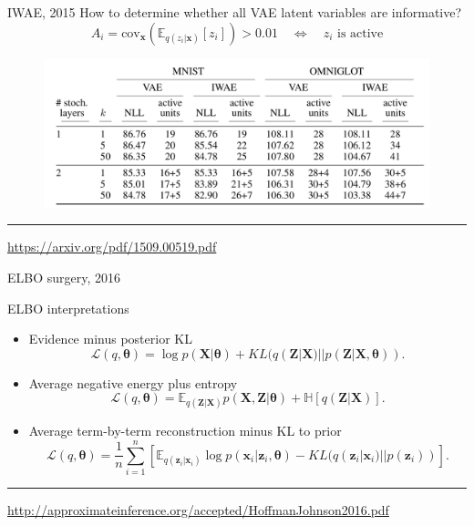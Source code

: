 \documentclass{beamer}
\newcommand{\bx}{\mathbf{x}}
\newcommand{\bz}{\mathbf{z}}
\newcommand{\bX}{\mathbf{X}}
\newcommand{\bZ}{\mathbf{Z}}
\newcommand{\btheta}{\boldsymbol{\theta}}
\begin{document}
\begin{frame}{IWAE, 2015}
How to determine whether all VAE latent variables are informative?
\[
    A_{i} = \text{cov}_\bx \left( \mathbb{E}_{q(z_i | \bx)} [z_i] \right) > 0.01 \quad \Leftrightarrow \quad z_i \text{ is active}
\]
\begin{figure}
    \centering
    \includegraphics[width=\linewidth]{figs/IWAE_3.png}
\end{figure}
\vfill
\hrule\medskip
{\scriptsize \href{https://arxiv.org/pdf/1509.00519.pdf}{https://arxiv.org/pdf/1509.00519.pdf}}
\end{frame}
\begin{frame}{ELBO surgery, 2016}
\begin{block}{ELBO interpretations}
\begin{itemize}
    \item Evidence minus posterior KL
    \[
        \mathcal{L}(q, \btheta) = \log p(\bX | \btheta) + KL(q(\bZ | \bX) || p(\bZ | \bX, \btheta)).
    \]
    \item Average negative energy plus entropy
    \[
        \mathcal{L}(q, \btheta) = \mathbb{E}_{q(\bZ | \bX)} p(\bX, \bZ | \btheta) + \mathbb{H} \left[q(\bZ | \bX) \right].
    \]
    \item Average term-by-term reconstruction minus KL to prior
    \[
        \mathcal{L}(q, \btheta) = \frac{1}{n} \sum_{i=1}^n \left[ \mathbb{E}_{q(\bz_i | \bx_i)} \log p(\bx_i | \bz_i, \btheta) - KL(q(\bz_i | \bx_i) || p(\bz_i)) \right].
    \]
\end{itemize}
\end{block}

\vfill
\hrule\medskip
{\scriptsize \href{http://approximateinference.org/accepted/HoffmanJohnson2016.pdf}{http://approximateinference.org/accepted/HoffmanJohnson2016.pdf}}
\end{frame}
\end{document}
